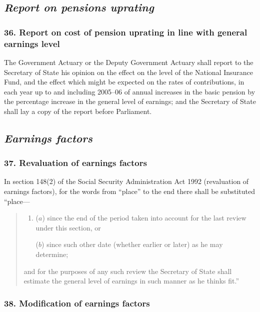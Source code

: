 \documentclass[12pt,a4paper]{article}
\begin{document}

\subsection{\itshape Report on pensions uprating}

\subsubsection{36. Report on cost of pension uprating in line with general earnings level}

The Government Actuary or the Deputy Government Actuary shall report to the Secretary of State his opinion on the effect on the level of the National Insurance Fund, and the effect which might be expected on the rates of contributions, in each year up to and including 2005--06 of annual increases in the basic pension by the percentage increase in the general level of earnings; and the Secretary of State shall lay a copy of the report before Parliament.

\subsection{\itshape Earnings factors}

\subsubsection{37. Revaluation of earnings factors}

In section 148(2)  of the Social Security Administration Act 1992 (revaluation of earnings factors), for the words from “place” to the end there shall be substituted “place—
\begin{quotation}
\begin{enumerate}\item[]\noindent
($a$) since the end of the period taken into account for the last review under this section, or

($b$) since such other date (whether earlier or later) as he may determine;
\end{enumerate}\noindent
and for the purposes of any such review the Secretary of State shall estimate the general level of earnings in such manner as he thinks fit.”
\end{quotation}

\subsubsection{38. Modification of earnings factors}
\end{document}
